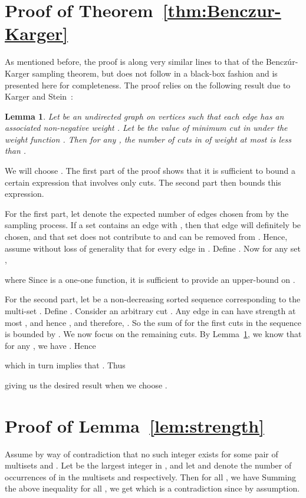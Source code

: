 \documentclass[11pt]{article}
\newtheorem{lemma}[theorem]{Lemma}
\newenvironment{proofof}[1]{\noindent{\bf Proof of #1:}}{\par}
\begin{document}
\section{Proof of Theorem~\ref{thm:Benczur-Karger}}
\label{append:bk}
As mentioned before, the proof is along very similar lines to that of the
Bencz\'{u}r-Karger sampling theorem, but does not follow in a black-box fashion
and is presented here for completeness. The proof relies on the following
result due to Karger and Stein~\cite{kargerstein96}:
\begin{lemma}
\label{lem:karger}
Let  be an undirected graph on  vertices such that each edge  has an associated
non-negative weight . Let  be the value of minimum cut in 
under the weight function . Then for any , the number of cuts in 
of weight at most  is less than .
\end{lemma}
\begin{proofof}{Theorem~\ref{thm:Benczur-Karger}}
  We will choose . The first part of the proof shows that it is
  sufficient to bound a certain expression that involves only cuts. The second
  part then bounds this expression.

  For the first part, let  denote the expected
  number of edges chosen from  by the sampling process. If a set  contains an edge  with , then that edge will
  definitely be chosen, and that set does not contribute to  and can be
  removed from . Hence, assume without loss of generality that  for every edge in . Define . Now for any set ,

  

  where
   Since  is
  a one-one function, it is sufficient to provide an upper-bound on
  .

  For the second part, let  be a non-decreasing sorted
  sequence corresponding to the multi-set . Define . Consider an arbitrary cut
  . Any edge in  can have strength at most , and hence
  , and therefore, . So the sum
  of  for the first  cuts in the sequence is bounded by
  . We now focus on the remaining cuts.  By Lemma~\ref{lem:karger},
  we know that for any , we have .  Hence
  
  which in turn implies that . Thus

  
  giving us the desired result when we choose .
\end{proofof}

\section{Proof of Lemma~\ref{lem:strength}}
\label{append:strength}
Assume by way of contradiction that no such integer  exists for some pair
of multisets  and .  Let  be the largest integer in , and let  and  denote the number of occurrences of 
in the multisets  and  respectively.  Then for all , we
have  Summing the above inequality for all , we get  which is a contradiction since  by assumption.
\end{document}
